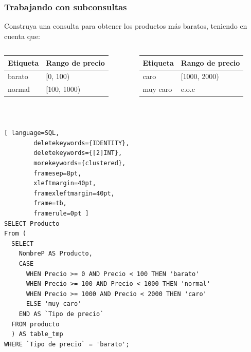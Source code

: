 \documentclass[
	10pt, %
	aspectratio=169, %
]{beamer}
\begin{document}

\begin{frame}[fragile]
	
	\frametitle{Trabajando con subconsultas}
	
	Construya una consulta para obtener los productos más baratos, teniendo en cuenta que: 
	
	\begin{columns}[t]
		\begin{table}[]
			\begin{tabular}{|l|l|}
				\hline
				Etiqueta & Rango de precio \\ \hline \hline
				barato   & {[}0, 100)        \\ \hline
				normal   & {[}100, 1000)       \\ \hline
			\end{tabular}
		\end{table}
		
		
		\begin{table}[]
			\begin{tabular}{|l|l|}
				\hline
				Etiqueta   & Rango de precio \\ \hline \hline
				caro          & {[}1000, 2000)        \\ \hline
				muy caro & e.o.c       \\ \hline
			\end{tabular}
		\end{table}
		
	\end{columns}
	
	\ 
	
	\pause
	
	\begin{lstlisting}[ language=SQL,
		deletekeywords={IDENTITY},
		deletekeywords={[2]INT},
		morekeywords={clustered},
		framesep=8pt,
		xleftmargin=40pt,
		framexleftmargin=40pt,
		frame=tb,
		framerule=0pt ]
SELECT Producto
From (
  SELECT 
    NombreP AS Producto, 
    CASE 
      WHEN Precio >= 0 AND Precio < 100 THEN 'barato'
      WHEN Precio >= 100 AND Precio < 1000 THEN 'normal'
      WHEN Precio >= 1000 AND Precio < 2000 THEN 'caro'
      ELSE 'muy caro'
    END AS `Tipo de precio`
  FROM producto
  ) AS table_tmp
WHERE `Tipo de precio` = 'barato';  
\end{lstlisting}
		
\end{frame}
\end{document}

